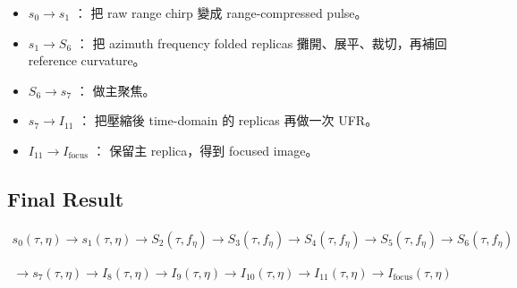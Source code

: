 \documentclass[10pt]{article}
\providecommand{\tightlist}{%
  \setlength{\itemsep}{0pt}\setlength{\parskip}{0pt}}
\begin{document}
\begin{itemize}
\tightlist
\item
  \(s_0 \rightarrow s_1\) ： 把 raw range chirp 變成 range-compressed
  pulse。
\item
  \(s_1 \rightarrow S_6\) ： 把 azimuth frequency folded replicas
  攤開、展平、裁切，再補回 reference curvature。
\item
  \(S_6 \rightarrow s_7\) ： 做主聚焦。
\item
  \(s_7 \rightarrow I_{11}\) ： 把壓縮後 time-domain 的 replicas
  再做一次 UFR。
\item
  \(I_{11} \rightarrow I_{\mathrm{focus}}\) ： 保留主 replica，得到
  focused image。
\end{itemize}

\hypertarget{final-result}{%
\subsection{Final Result}\label{final-result}}

\begin{equation}
\begin{aligned}
s_0(\tau,\eta)\rightarrow s_1(\tau,\eta)\rightarrow S_2(\tau,f_\eta)\rightarrow S_3(\tau,f_\eta)\rightarrow S_4(\tau,f_\eta)\rightarrow S_5(\tau,f_\eta)\rightarrow S_6(\tau,f_\eta)
\end{aligned}
\end{equation}

\begin{equation}
\begin{aligned}
\rightarrow s_7(\tau,\eta)\rightarrow I_8(\tau,\eta)\rightarrow I_9(\tau,\eta)\rightarrow I_{10}(\tau,\eta)\rightarrow I_{11}(\tau,\eta)\rightarrow I_{\mathrm{focus}}(\tau,\eta)
\end{aligned}
\end{equation}
\end{document}
